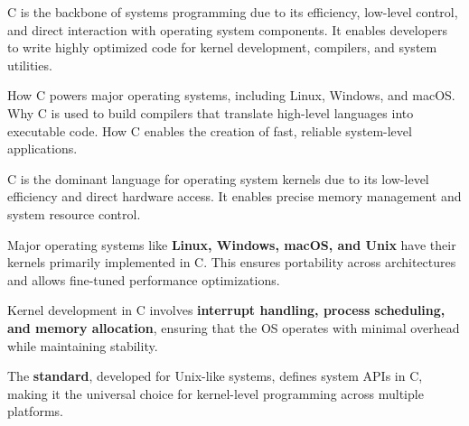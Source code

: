 \begin{NxSSSBox}
	\begin{NxIDBox}
		C is the backbone of systems programming due to its efficiency, low-level control, and direct interaction with operating system components. It enables developers to write highly optimized code for kernel development, compilers, and system utilities.
	\end{NxIDBox}
	\begin{NxIDBoxL}
		 How C powers major operating systems, including Linux, Windows, and macOS.
		 Why C is used to build compilers that translate high-level languages into executable code.
		 How C enables the creation of fast, reliable system-level applications.
	\end{NxIDBoxL}
\end{NxSSSBox}

\begin{NxSSSSBox}
	\begin{NxIDBox}
		C is the dominant language for operating system kernels due to its low-level efficiency and direct hardware access. It enables precise memory management and system resource control.
	\end{NxIDBox}
	\begin{NxIDBox}
		Major operating systems like \textbf{Linux, Windows, macOS, and Unix} have their kernels primarily implemented in C. This ensures portability across architectures and allows fine-tuned performance optimizations.
	\end{NxIDBox}
	\begin{NxIDBox}
		Kernel development in C involves \textbf{interrupt handling, process scheduling, and memory allocation}, ensuring that the OS operates with minimal overhead while maintaining stability.
	\end{NxIDBox}
	\begin{NxIDBox}
		The \textbf{ standard}, developed for Unix-like systems, defines system APIs in C, making it the universal choice for kernel-level programming across multiple platforms.
	\end{NxIDBox}
\end{NxSSSSBox}

